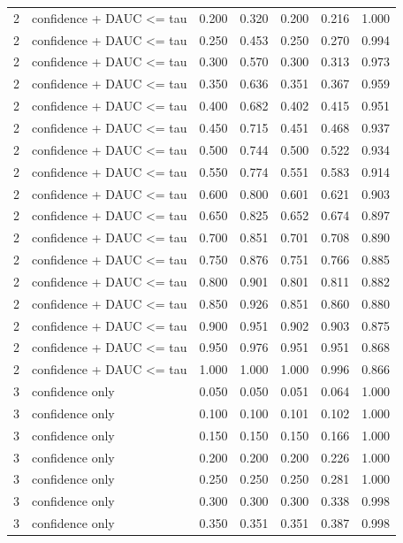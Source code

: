 \begin{tabular}{rlrrrrr}
2 & confidence + DAUC <= tau & 0.200 & 0.320 & 0.200 & 0.216 & 1.000 \\
2 & confidence + DAUC <= tau & 0.250 & 0.453 & 0.250 & 0.270 & 0.994 \\
2 & confidence + DAUC <= tau & 0.300 & 0.570 & 0.300 & 0.313 & 0.973 \\
2 & confidence + DAUC <= tau & 0.350 & 0.636 & 0.351 & 0.367 & 0.959 \\
2 & confidence + DAUC <= tau & 0.400 & 0.682 & 0.402 & 0.415 & 0.951 \\
2 & confidence + DAUC <= tau & 0.450 & 0.715 & 0.451 & 0.468 & 0.937 \\
2 & confidence + DAUC <= tau & 0.500 & 0.744 & 0.500 & 0.522 & 0.934 \\
2 & confidence + DAUC <= tau & 0.550 & 0.774 & 0.551 & 0.583 & 0.914 \\
2 & confidence + DAUC <= tau & 0.600 & 0.800 & 0.601 & 0.621 & 0.903 \\
2 & confidence + DAUC <= tau & 0.650 & 0.825 & 0.652 & 0.674 & 0.897 \\
2 & confidence + DAUC <= tau & 0.700 & 0.851 & 0.701 & 0.708 & 0.890 \\
2 & confidence + DAUC <= tau & 0.750 & 0.876 & 0.751 & 0.766 & 0.885 \\
2 & confidence + DAUC <= tau & 0.800 & 0.901 & 0.801 & 0.811 & 0.882 \\
2 & confidence + DAUC <= tau & 0.850 & 0.926 & 0.851 & 0.860 & 0.880 \\
2 & confidence + DAUC <= tau & 0.900 & 0.951 & 0.902 & 0.903 & 0.875 \\
2 & confidence + DAUC <= tau & 0.950 & 0.976 & 0.951 & 0.951 & 0.868 \\
2 & confidence + DAUC <= tau & 1.000 & 1.000 & 1.000 & 0.996 & 0.866 \\
3 & confidence only & 0.050 & 0.050 & 0.051 & 0.064 & 1.000 \\
3 & confidence only & 0.100 & 0.100 & 0.101 & 0.102 & 1.000 \\
3 & confidence only & 0.150 & 0.150 & 0.150 & 0.166 & 1.000 \\
3 & confidence only & 0.200 & 0.200 & 0.200 & 0.226 & 1.000 \\
3 & confidence only & 0.250 & 0.250 & 0.250 & 0.281 & 1.000 \\
3 & confidence only & 0.300 & 0.300 & 0.300 & 0.338 & 0.998 \\
3 & confidence only & 0.350 & 0.351 & 0.351 & 0.387 & 0.998 \\

\end{tabular}
